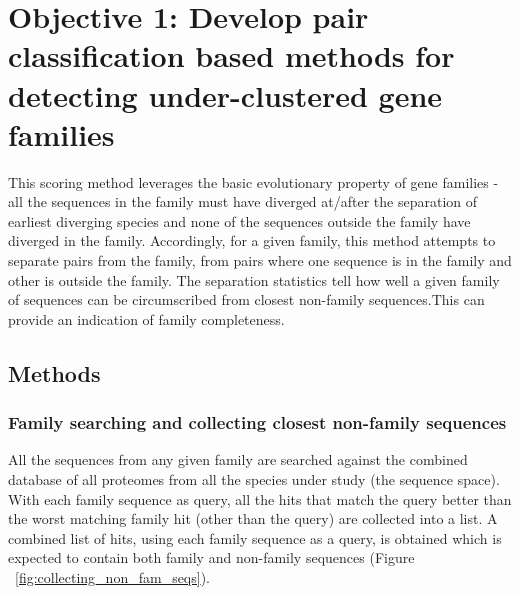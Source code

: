 \documentclass{article}
\begin{document}
		\pagebreak

	\section{Objective 1: Develop pair classification based methods for detecting under-clustered gene families} 
	This scoring method leverages the basic evolutionary property of gene families - all the sequences in the family must have diverged at/after the separation of earliest diverging species and none of the sequences outside the family have diverged in the family. Accordingly, for a given family, this method attempts to separate pairs from the family, from pairs where one sequence is in the family and other is outside the family. The separation statistics tell how well a given family of sequences can be circumscribed from closest non-family sequences.This can provide an indication of family completeness.
		\subsection{Methods}
			\subsubsection{Family searching and collecting closest non-family sequences}
			All the sequences from any given family are searched against the combined database of all proteomes from all the species under study (the sequence space). With each family sequence as query, all the hits that match the query better than the worst matching family hit (other than the query) are collected into a list. A combined list of hits, using each family sequence as a query, is obtained which is expected to contain both family and non-family sequences (Figure ~\ref{fig:collecting_non_fam_seqs}).
			
\end{document}
